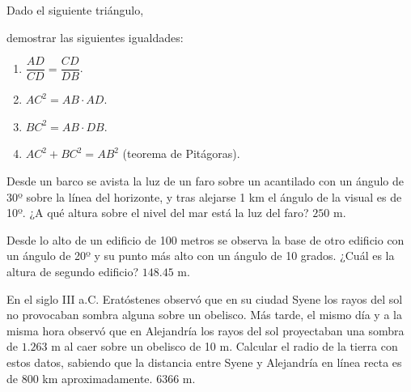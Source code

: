 {
Dado el siguiente triángulo,
\begin{center}
\end{center}

demostrar las siguientes igualdades:
\begin{enumerate}
\item $\dfrac{AD}{CD}=\dfrac{CD}{DB}$.
\item $AC^2= AB\cdot AD$.
\item $BC^2= AB\cdot DB$.
\item $AC^2 + BC^2= AB^2$ (teorema de Pitágoras).
\end{enumerate}

}
{
}
{
}


{
Desde un barco se avista la luz de un faro sobre un acantilado con un ángulo de 30º sobre la línea del horizonte, y tras alejarse 1 km el ángulo de la visual es de 10º.
¿A qué altura sobre el nivel del mar está la luz del faro?
}
{$250$ m.
}
{
}


{
Desde lo alto de un edificio de 100 metros se observa la base de otro edificio con un ángulo de 20º y su punto más alto con un ángulo de 10 grados.
¿Cuál es la altura de segundo edificio?
}
{$148.45$ m.
}
{
}


{
En el siglo III a.C. Eratóstenes observó que en su ciudad Syene los rayos del sol no provocaban sombra alguna sobre un obelisco. 
Más tarde, el mismo día y a la misma hora observó que en Alejandría los rayos del sol proyectaban una sombra de $1.263$ m al caer sobre un obelisco de 10 m. 
Calcular el radio de la tierra con estos datos, sabiendo que la distancia entre Syene y Alejandría en línea recta es de 800 km aproximadamente. 
}
{$6366$ m.
}
{
}


